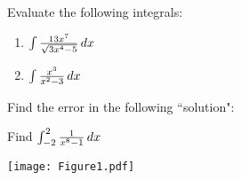\documentclass[nooutcomes]{ximera}
\begin{document}
\begin{problem}
Evaluate the following integrals:

	\begin{enumerate}
	
	\item  $\int \frac{13x^7}{\sqrt{3x^4-5}} \,d x$
		\begin{freeResponse}
		
		\end{freeResponse}
		
		
		
	\item  $\int \frac{x^3}{x^2 - 3} \,d x$
		\begin{freeResponse}
		
		\end{freeResponse}
		
		
		
	\end{enumerate}
			
			
	
\end{problem}







\begin{problem}
Find the error in the following ``solution":

Find $\int_{-2}^2 \frac{1}{x^8 - 1} \,d x$

	\begin{image}
	\texttt{[image: Figure1.pdf]}
	\end{image}

	\begin{freeResponse}
		
	\end{freeResponse}

\end{problem}








	
	
	
	
	
	
	
	
	

	










								
				
				
	
\end{document}
